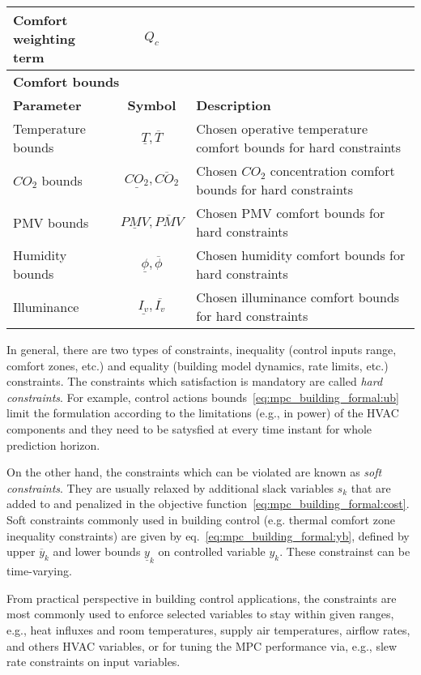 \documentclass[10pt]{extarticle}
\begin{document}
\begin{table}[h]
\begin{tabular}{l|c|l}
		\makecell[l]{Comfort weighting \\ term} & $Q_c$ & \makecell[l]{Weighting term for the comfort term in the objective function}  \\
		\midrule
		\multicolumn{3}{l}{\textbf{Comfort bounds}} \\
		\midrule
		\textbf{Parameter}  & \textbf{Symbol} &  \textbf{Description} \\
		\midrule
		Temperature bounds & $\underline{T},\overline{T}$ & Chosen operative temperature comfort bounds for hard constraints \\
		$CO_2$ bounds & $\underline{CO_2},\overline{CO_2}$ & Chosen $CO_2$ concentration comfort bounds for hard constraints \\
		PMV bounds & $\underline{PMV},\overline{PMV}$ &  Chosen PMV comfort bounds for hard constraints \\
		Humidity bounds & $\underline{\phi},\overline{\phi}$ &  Chosen humidity comfort bounds for hard constraints \\
		Illuminance & $\underline{I_v},\overline{I_v}$ & Chosen illuminance comfort bounds for hard constraints  \\
		\bottomrule 
	\end{tabular}
\end{table}

In general, there are two types of constraints,
inequality  (control inputs range, comfort zones, etc.) and equality 
(building model dynamics, rate limits, etc.) constraints.
The constraints which satisfaction is mandatory are called 
\textit{hard constraints}. For example, control actions
bounds~\eqref{eq:mpc_building_formal:ub} limit the formulation
according to the limitations (e.g., in power) of the HVAC components
and they need to be satysfied at every time instant for whole prediction horizon.

On the other hand, the constraints which can be violated are
known as \textit{soft constraints}. They are usually relaxed
by additional slack variables $s_k$ that are added to and
penalized in the objective function~\eqref{eq:mpc_building_formal:cost}.
Soft constraints commonly used in building control (e.g. thermal comfort
zone inequality constraints) are given by eq.~\eqref{eq:mpc_building_formal:yb},
defined by upper $\overline{y}_k$  and lower bounds $\underline{y}_k$
on controlled variable $y_{k}$. These constrainst can be time-varying.

From practical perspective in building control applications,
the constraints are most commonly used to enforce selected
variables to stay within given ranges, e.g., heat influxes
and room temperatures, supply air temperatures, airflow rates,
and others HVAC variables, or for tuning the MPC performance via,
e.g., slew rate constraints on input variables.
\end{document}
